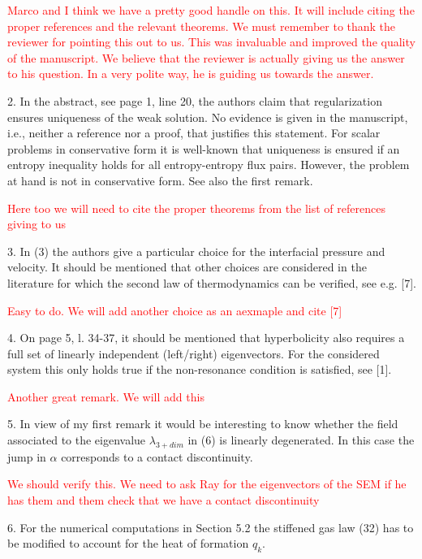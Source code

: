\documentclass{article}
\newcommand{\tcr}[1]{\textcolor{red}{#1}}
\begin{document}
\tcr{Marco and I think we have a pretty good handle on this. It will include
citing the proper references and the relevant theorems. We must remember to thank the reviewer
for pointing this out to us. This was invaluable and improved the quality of the manuscript.
We believe that the reviewer is actually giving us the answer to his question. In a very
polite way, he is guiding us towards the answer.}
\bigskip


{\color{blue}
2. In the abstract, see page 1, line 20, the authors claim that regularization ensures
uniqueness of the weak solution. No evidence is given in the manuscript, i.e., neither
a reference nor a proof, that justifies this statement. For scalar problems in 
conservative form it is well-known that uniqueness is ensured if an entropy inequality
holds for all entropy-entropy flux pairs. However, the problem at hand is not in
conservative form. See also the first remark.}

\tcr{Here too we will need to cite the proper theorems from the list of references giving to us}
\bigskip


{\color{blue}
3. In (3) the authors give a particular choice for the interfacial pressure and velocity.
It should be mentioned that other choices are considered in the literature for which
the second law of thermodynamics can be verified, see e.g. [7].}

\tcr{Easy to do. We will add another choice as an aexmaple and cite [7]}
\bigskip


{\color{blue}
4. On page 5, l. 34-37, it should be mentioned that hyperbolicity also requires a full
set of linearly independent (left/right) eigenvectors. For the considered system this
only holds true if the non-resonance condition is satisfied, see [1].
}

\tcr{Another great remark. We will add this}
\bigskip


{\color{blue}
5. In view of my first remark it would be interesting to know whether the field associated
to the eigenvalue $\lambda_{3+dim}$ in (6) is linearly degenerated. In this case the jump in $\alpha$
corresponds to a contact discontinuity.
}

\tcr{We should verify this. We need to ask Ray for the eigenvectors of the SEM if he has them and them check that
we have a contact discontinuity}
\bigskip


{\color{blue}
6. For the numerical computations in Section 5.2 the stiffened gas law (32) has to be
modified to account for the heat of formation $q_k$.}
\end{document}
